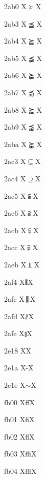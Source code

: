 \documentclass[11pt]{article}
\begin{document}
2ab0 X{\ensuremath{\succeq}}X

2ab3 X{\ensuremath{\preceqq}}X

2ab4 X{\ensuremath{\succeqq}}X

2ab5 X{\ensuremath{\precneqq}}X

2ab6 X{\ensuremath{\succneqq}}X

2ab7 X{\ensuremath{\precapprox}}X

2ab8 X{\ensuremath{\succapprox}}X

2ab9 X{\ensuremath{\precnapprox}}X

2aba X{\ensuremath{\succnapprox}}X

2ac3 X{\ensuremath{\dot{\subseteq}}}X

2ac4 X{\ensuremath{\dot{\supseteq}}}X

2ac5 X{\ensuremath{\subseteqq}}X

2ac6 X{\ensuremath{\supseteqq}}X

2acb X{\ensuremath{\subsetneqq}}X

2acc X{\ensuremath{\supsetneqq}}X

2aeb X{\ensuremath{\Perp}}X

2af4 X{\ensuremath{\interleave}}X

2afc X{\ensuremath{\biginterleave}}X

2afd X{\ensuremath{\sslash}}X

2afe X{\ensuremath{\talloblong}}X

2e18 X{\textinterrobangdown}X

2e1a X{\"{-}}X

2e1e X{\ensuremath{\dot{\sim}}}X

fb00 X{ff}X

fb01 X{fi}X

fb02 X{fl}X

fb03 X{ffi}X

fb04 X{ffl}X
\end{document}
